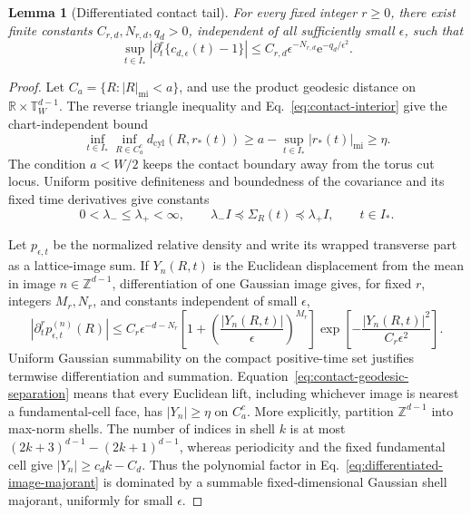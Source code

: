 \documentclass[aps,physrev,onecolumn,amsmath,amssymb,longbibliography]{revtex4-2}
\newcommand{\e}{\mathrm e}
\newtheorem{lemma}[theorem]{Lemma}
\begin{document}
\begin{lemma}[Differentiated contact tail]
\label{lem:contact-tail}
For every fixed integer \(r\ge0\), there exist finite constants
\(C_{r,d},N_{r,d},q_d>0\), independent of all sufficiently small
\(\epsilon\), such that
\begin{equation}
 \sup_{t\in I_*}
 \left|\partial_t^r\{c_{d,\epsilon}(t)-1\}\right|
 \le C_{r,d}\epsilon^{-N_{r,d}}\e^{-q_d/\epsilon^2}.
 \label{eq:contact-tail}
\end{equation}
\end{lemma}

\begin{proof}
Let \(C_a=\{R:|R|_{\mathrm{mi}}<a\}\), and use the product geodesic distance
on \(\mathbb R\times\mathbb T_W^{d-1}\).  The reverse triangle inequality and
Eq.~\eqref{eq:contact-interior} give the chart-independent bound
\begin{equation}
 \inf_{t\in I_*}\inf_{R\in C_a^c}
 d_{\mathrm{cyl}}(R,r_*(t))
 \ge a-\sup_{t\in I_*}|r_*(t)|_{\mathrm{mi}}\ge\eta.
 \label{eq:contact-geodesic-separation}
\end{equation}
The condition \(a<W/2\) keeps the contact boundary away from the torus cut
locus.  Uniform positive definiteness and boundedness of the covariance and
its fixed time derivatives give constants
\begin{equation}
 0<\lambda_-\le\lambda_+<\infty,
 \qquad
 \lambda_-I\preceq\Sigma_R(t)\preceq\lambda_+I,
 \qquad t\in I_*.
 \label{eq:relative-covariance-bounds}
\end{equation}

Let \(p_{\epsilon,t}\) be the normalized relative density and write its wrapped
transverse part as a lattice-image sum.  If \(Y_n(R,t)\) is the Euclidean
displacement from the mean in image \(n\in\mathbb Z^{d-1}\), differentiation
of one Gaussian image gives, for fixed \(r\), integers \(M_r,N_r\), and
constants independent of small \(\epsilon\),
\begin{equation}
 \left|\partial_t^rp_{\epsilon,t}^{(n)}(R)\right|
 \le C_r\epsilon^{-d-N_r}
 \left[1+\left(\frac{|Y_n(R,t)|}{\epsilon}\right)^{M_r}\right]
 \exp\!\left[-\frac{|Y_n(R,t)|^2}{C_r\epsilon^2}\right].
 \label{eq:differentiated-image-majorant}
\end{equation}
Uniform Gaussian summability on the compact positive-time set justifies
termwise differentiation and summation.  Equation~\eqref{eq:contact-geodesic-separation}
means that every Euclidean lift, including whichever image is nearest a
fundamental-cell face, has \(|Y_n|\ge\eta\) on \(C_a^c\).  More explicitly,
partition \(\mathbb Z^{d-1}\) into max-norm shells.  The number of indices in
shell \(k\) is at most \((2k+3)^{d-1}-(2k+1)^{d-1}\), whereas periodicity and
the fixed fundamental cell give \(|Y_n|\ge c_d k-C_d\).  Thus the polynomial
factor in Eq.~\eqref{eq:differentiated-image-majorant} is dominated by a
summable fixed-dimensional Gaussian shell majorant, uniformly for small
\(\epsilon\).


\end{proof}
\end{document}

